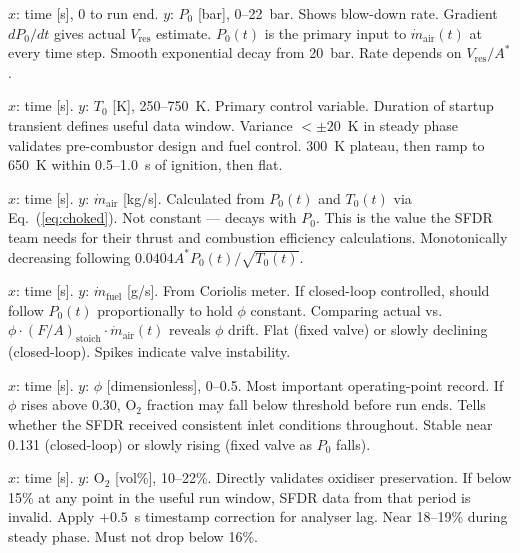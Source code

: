 \documentclass[12pt,a4paper]{report}
\begin{document}
  {$x$: time [s], 0 to run end. \quad $y$: $P_0$ [bar], 0--22~bar.}
  {Shows blow-down rate. Gradient $dP_0/dt$ gives actual $V_\text{res}$ estimate.
   $P_0(t)$ is the primary input to $\dot{m}_\text{air}(t)$ at every time step.}
  {Smooth exponential decay from 20~bar. Rate depends on $V_\text{res}/A^*$.}

  {$x$: time [s]. \quad $y$: $T_0$ [K], 250--750~K.}
  {Primary control variable. Duration of startup transient defines useful data window.
   Variance $< \pm 20$~K in steady phase validates pre-combustor design and fuel control.}
  {300~K plateau, then ramp to 650~K within 0.5--1.0~s of ignition, then flat.}

  {$x$: time [s]. \quad $y$: $\dot{m}_\text{air}$ [kg/s].}
  {Calculated from $P_0(t)$ and $T_0(t)$ via Eq.~(\ref{eq:choked}).
   Not constant — decays with $P_0$. This is the value the SFDR team needs for
   their thrust and combustion efficiency calculations.}
  {Monotonically decreasing following $0.0404 A^* P_0(t)/\sqrt{T_0(t)}$.}

  {$x$: time [s]. \quad $y$: $\dot{m}_\text{fuel}$ [g/s].}
  {From Coriolis meter. If closed-loop controlled, should follow $P_0(t)$
   proportionally to hold $\phi$ constant. Comparing actual vs.\
   $\phi\cdot(F/A)_\text{stoich}\cdot\dot{m}_\text{air}(t)$ reveals $\phi$ drift.}
  {Flat (fixed valve) or slowly declining (closed-loop). Spikes indicate valve instability.}

  {$x$: time [s]. \quad $y$: $\phi$ [dimensionless], 0--0.5.}
  {Most important operating-point record.  If $\phi$ rises above 0.30, O$_2$
   fraction may fall below threshold before run ends.  Tells whether the SFDR
   received consistent inlet conditions throughout.}
  {Stable near 0.131 (closed-loop) or slowly rising (fixed valve as $P_0$ falls).}

  {$x$: time [s]. \quad $y$: O$_2$ [vol\%], 10--22\%.}
  {Directly validates oxidiser preservation. If below 15\% at any point in the
   useful run window, SFDR data from that period is invalid. Apply $+0.5$~s
   timestamp correction for analyser lag.}
  {Near 18--19\% during steady phase. Must not drop below 16\%.}
\end{document}
